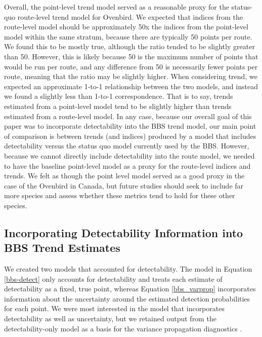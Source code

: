\documentclass[12pt]{article}
\begin{document}
\par Overall, the point-level trend model served as a reasonable proxy for the status-quo route-level trend model for Ovenbird.
We expected that indices from the route-level model should be approximately 50x the indices from the point-level model within the same stratum, because there are typically 50 points per route.
We found this to be mostly true, although the ratio tended to be slightly greater than 50.
However, this is likely because 50 is the maximum number of points that would be run per route, and any difference from 50 is necessarily fewer points per route, meaning that the ratio may be slightly higher.
When considering trend, we expected an approximate 1-to-1 relationship between the two models, and instead we found a slightly less than 1-to-1 correspondence.
That is to say, trends estimated from a point-level model tend to be slightly higher than trends estimated from a route-level model.
In any case, because our overall goal of this paper was to incorporate detectability into the BBS trend model, our main point of comparison is between trends (and indices) produced by a model that includes detectability versus the status quo model currently used by the BBS.
However, because we cannot directly include detectability into the route model, we needed to have the baseline point-level model as a proxy for the route-level indices and trends.
We felt as though the point level model served as a good proxy in the case of the Ovenbird in Canada, but future studies should seek to include far more species and assess whether these metrics tend to hold for these other species. 

\subsection{Incorporating Detectability Information into BBS Trend Estimates}

\par We created two models that accounted for detectability.
The model in Equation \ref{bbs-detect} only accounts for detectability and treats each estimate of detectability as a fixed, true point, whereas Equation \ref{bbs_varprop} incorporates information about the uncertainty around the estimated detection probabilities for each point.
We were most interested in the model that incorporates detectability as well as uncertainty, but we retained output from the detectability-only model as a basis for the variance propagation diagnostics \citep{bravington_variance_2021}.
\end{document}
